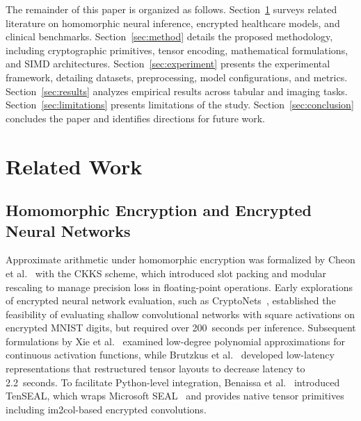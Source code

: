 \documentclass[conference]{IEEEtran}
\begin{document}
The remainder of this paper is organized as follows. Section~\ref{sec:related} surveys related literature on homomorphic neural inference, encrypted healthcare models, and clinical benchmarks. Section~\ref{sec:method} details the proposed methodology, including cryptographic primitives, tensor encoding, mathematical formulations, and SIMD architectures. Section~\ref{sec:experiment} presents the experimental framework, detailing datasets, preprocessing, model configurations, and metrics. Section~\ref{sec:results} analyzes empirical results across tabular and imaging tasks. Section~\ref{sec:limitations} presents limitations of the study. Section~\ref{sec:conclusion} concludes the paper and identifies directions for future work.

\section{Related Work}\label{sec:related}

\subsection{Homomorphic Encryption and Encrypted Neural Networks}
Approximate arithmetic under homomorphic encryption was formalized by Cheon et al.~\cite{cheon2017} with the CKKS scheme, which introduced slot packing and modular rescaling to manage precision loss in floating-point operations. Early explorations of encrypted neural network evaluation, such as CryptoNets~\cite{cryptonets2016}, established the feasibility of evaluating shallow convolutional networks with square activations on encrypted MNIST digits, but required over 200~seconds per inference. Subsequent formulations by Xie et al.~\cite{xie2014} examined low-degree polynomial approximations for continuous activation functions, while Brutzkus et al.~\cite{brutzkus2019} developed low-latency representations that restructured tensor layouts to decrease latency to 2.2~seconds. To facilitate Python-level integration, Benaissa et al.~\cite{tenseal2021} introduced TenSEAL, which wraps Microsoft SEAL~\cite{seal2020} and provides native tensor primitives including im2col-based encrypted convolutions.
\end{document}
